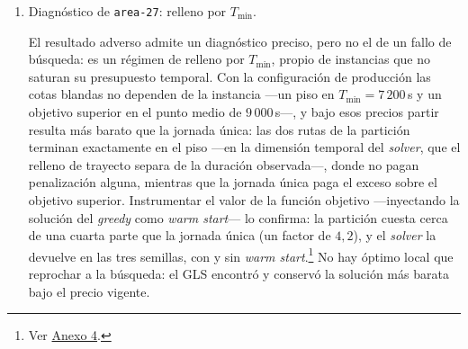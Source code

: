\begin{enumerate}
El criterio se cumple en dos de las tres áreas. En \texttt{area-26-n157} el \textit{solver} gana
con holgura: reduce el desplazamiento un $11{,}7$\,\% respecto del \textit{greedy} refinado,
alcanza un balance de $0{,}872$ frente a $0{,}276$ y ninguna de sus rutas supera el 82\,\% de
$T_{\max}$; el \textit{baseline} reparte los 157 árboles en dos jornadas al borde de $T_{\max}$ y
un muñón de $2\,962$\,s, mientras que el \textit{solver} produce tres jornadas parejas. Es el caso
que el criterio anticipaba: la ventaja del método no se agota en el desplazamiento, sino en que
entrega jornadas ejecutables. En \texttt{area-29-n43} el criterio también se cumple, aunque de
forma poco informativa: el \textit{solver} empeora el desplazamiento un $2{,}4$\,\%, dentro del
margen declarado del 5\,\%, con $k=1$ en ambos métodos; con 43 árboles ambos resuelven el mismo
recorrido único.

En \texttt{area-27-n72} el criterio falla, y por un margen amplio. El \textit{greedy} refinado
cubre los 72 árboles en una sola jornada de $10\,209$\,s ---el $94{,}5$\,\% de $T_{\max}$--- con
$1\,569$\,s de desplazamiento, mientras que el \textit{solver} abre dos rutas y gasta $2\,466$\,s,
un $57$\,\% más de caminata y dos medias jornadas en lugar de una completa. No hay aquí ruta
degenerada que reprochar al \textit{baseline}: su solución es la que un censista preferiría. Como
el criterio exigía las tres áreas, el veredicto global frente al pre-registro es de incumplimiento,
y así se reporta.

\item Diagnóstico de \texttt{area-27}: relleno por $T_{\min}$.

El resultado adverso admite un diagnóstico preciso, pero no el de un fallo de búsqueda: es un
régimen de relleno por $T_{\min}$, propio de instancias que no saturan su presupuesto temporal.
Con la configuración de producción las cotas blandas no dependen de la instancia ---un piso en
$T_{\min} = 7\,200$\,s y un objetivo superior en el punto medio de $9\,000$\,s---, y bajo esos
precios partir resulta más barato que la jornada única: las dos rutas de la partición terminan
exactamente en el piso ---en la dimensión temporal del \textit{solver}, que el relleno de trayecto
separa de la duración observada---, donde no pagan penalización alguna, mientras que la jornada única paga el
exceso sobre el objetivo superior. Instrumentar el valor de la función objetivo ---inyectando la
solución del \textit{greedy} como \textit{warm start}--- lo confirma: la partición cuesta cerca de
una cuarta parte que la jornada única (un factor de $4{,}2$), y el \textit{solver} la devuelve en
las tres semillas, con y sin \textit{warm start}.\footnote{Ver
\hyperref[anx:objetivo-area27]{Anexo 4}.} No hay óptimo local que reprochar a la búsqueda: el GLS
encontró y conservó la solución más barata bajo el precio vigente.


\end{enumerate}
